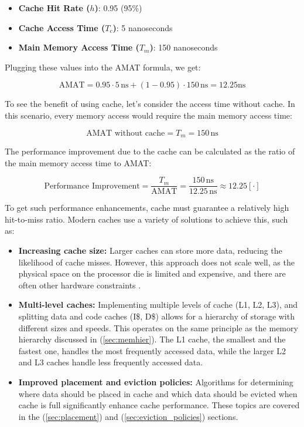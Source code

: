 \begin{itemize}
    \item \textbf{Cache Hit Rate ($h$)}: 0.95 (95\%) \cite{comparchaquant}
    \item \textbf{Cache Access Time ($T_c$)}: 5 nanoseconds \cite{Patterson2013}
    \item \textbf{Main Memory Access Time ($T_m$)}: 150 nanoseconds \cite{Hamacher2011}
\end{itemize}

\noindent Plugging these values into the AMAT formula, we get:

\[
\text{AMAT} = 0.95 \cdot 5 \, \text{ns} + (1 - 0.95) \cdot 150 \, \text{ns} = 12.25 \text{ns}
\]

\noindent To see the benefit of using cache, let's consider the access time without cache. In this scenario, every memory access would require the main memory access time:

\[
\text{AMAT without cache} = T_m = 150 \, \text{ns}
\]

\noindent The performance improvement due to the cache can be calculated as the ratio of the main memory access time to AMAT:

\[
\text{Performance Improvement} = \frac{T_m}{\text{AMAT}} = \frac{150 \, \text{ns}}{12.25 \, \text{ns}} \approx 12.25 [\cdot]
\]

\vspace{10px} \noindent To get such performance enhancements, cache must guarantee a relatively high hit-to-miss ratio. Modern caches use a variety of solutions to achieve this, such as:

\begin{itemize}
	\item \textbf{Increasing cache size:} Larger caches can store more data, reducing the likelihood of cache misses. However, this approach does not scale well,
		as the physical space on the processor die is limited and expensive, and there are often other hardware constraints \cite{Smith1982, Hill1989}.
	\item \textbf{Multi-level caches:} Implementing multiple levels of cache (L1, L2, L3), and splitting data and code caches (I\$, D\$) allows for a hierarchy of storage with different
		sizes and speeds. This operates on the same principle as the memory hierarchy discussed in (\ref{sec:memhier}). The L1 cache, the smallest and the fastest one, handles the most frequently accessed data,
		while the larger L2 and L3 caches handle less frequently accessed data.
	\item \textbf{Improved placement and eviction policies:} Algorithms for determining where data should be placed in cache and which data should be evicted when cache is full
		significantly enhance cache performance. These topics are covered in the (\ref{sec:placement}) and (\ref{sec:eviction_policies}) sections.
\end{itemize}

